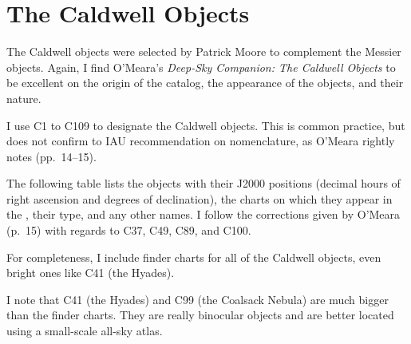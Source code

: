 
\chapter{The Caldwell Objects}

The Caldwell objects were selected by Patrick Moore to complement the Messier objects. Again, I find O’Meara’s \emph{Deep-Sky Companion: The Caldwell Objects} to be excellent on the origin of the catalog, the appearance of the objects, and their nature.

I use C1 to C109 to designate the Caldwell objects. This is common practice, but does not confirm to IAU recommendation on nomenclature, as O’Meara rightly notes (pp.\ 14--15).

The following table lists the objects with their J2000 positions (decimal hours of right ascension and degrees of declination), the charts on which they appear in the {\PSA}, their type, and any other names. I follow the corrections given by O’Meara (p.\ 15) with regards to C37, C49, C89, and C100.

For completeness, I include finder charts for all of the Caldwell objects, even bright ones like C41 (the Hyades).

I note that C41 (the Hyades) and C99 (the Coalsack Nebula) are much bigger than the finder charts. They are really binocular objects and are better located using a small-scale all-sky atlas.


\clearpage

